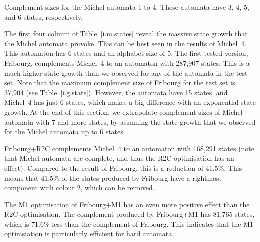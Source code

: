 \begin{table}[htb]
\centering

\caption{Complement sizes for the Michel automata 1 to 4. These automata have 3, 4, 5, and 6 states, respectively.}
\label{i.m.states}
\end{table}


The first four column of Table~\ref{i.m.states} reveal the massive state growth that the Michel automata provoke. This can be best seen in the results of Michel~4. This automaton has 6 states and an alphabet size of 5. The first tested version, Fribourg, complements Michel~4 to an automaton with 287,907 states. This is a much higher state growth than we observed for any of the automata in the \goal{} test set. Note that the maximum complement size of Fribourg for the \goal{} test set is 37,904 (see Table~\ref{i.g.stats}). However, the \goal{} automata have 15 states, and Michel~4 has just 6 states, which makes a big difference with an exponential state growth. At the end of this section, we extrapolate complement sizes of Michel automata with 7 and more states, by assuming the state growth that we observed for the Michel automata up to 6 states.

Fribourg+R2C complements Michel~4 to an automaton with 168,291 states (note that Michel automata are complete, and thus the R2C optimisation has an effect). Compared to the result of Fribourg, this is a reduction of 41.5\%. This means that 41.5\% of the states produced by Fribourg have a rightmost component with colour 2, which can be removed.

The M1 optimisation of Fribourg+M1 has an even more positive effect than the R2C optimisation. The complement produced by Fribourg+M1 has 81,765 states, which is 71.6\% less than the complement of Fribourg. This indicates that the M1 optimsiation is particularly efficient for hard automata.

